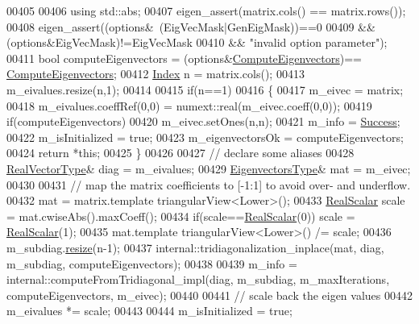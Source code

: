 \begin{DoxyCode}
00405   
00406   \textcolor{keyword}{using} std::abs;
00407   eigen\_assert(matrix.cols() == matrix.rows());
00408   eigen\_assert((options&~(EigVecMask|GenEigMask))==0
00409           && (options&EigVecMask)!=EigVecMask
00410           && \textcolor{stringliteral}{"invalid option parameter"});
00411   \textcolor{keywordtype}{bool} computeEigenvectors = (options&\hyperlink{group__enums_ggae3e239fb70022eb8747994cf5d68b4a9ada93d8885bde32b876ba4af01d3292cc}{ComputeEigenvectors})==
      \hyperlink{group__enums_ggae3e239fb70022eb8747994cf5d68b4a9ada93d8885bde32b876ba4af01d3292cc}{ComputeEigenvectors};
00412   \hyperlink{group___eigenvalues___module_a8a59ab7734b6eae2754fd78bc7c3a360}{Index} n = matrix.cols();
00413   m\_eivalues.resize(n,1);
00414 
00415   \textcolor{keywordflow}{if}(n==1)
00416   \{
00417     m\_eivec = matrix;
00418     m\_eivalues.coeffRef(0,0) = numext::real(m\_eivec.coeff(0,0));
00419     \textcolor{keywordflow}{if}(computeEigenvectors)
00420       m\_eivec.setOnes(n,n);
00421     m\_info = \hyperlink{group__enums_gga85fad7b87587764e5cf6b513a9e0ee5ea52581b035f4b59c203b8ff999ef5fcea}{Success};
00422     m\_isInitialized = \textcolor{keyword}{true};
00423     m\_eigenvectorsOk = computeEigenvectors;
00424     \textcolor{keywordflow}{return} *\textcolor{keyword}{this};
00425   \}
00426 
00427   \textcolor{comment}{// declare some aliases}
00428   \hyperlink{class_eigen_1_1internal_1_1_tensor_lazy_evaluator_writable}{RealVectorType}& diag = m\_eivalues;
00429   \hyperlink{group___core___module}{EigenvectorsType}& mat = m\_eivec;
00430 
00431   \textcolor{comment}{// map the matrix coefficients to [-1:1] to avoid over- and underflow.}
00432   mat = matrix.template triangularView<Lower>();
00433   \hyperlink{group___eigenvalues___module_a5dae5f422a3c71060e6bd31332bf64fd}{RealScalar} scale = mat.cwiseAbs().maxCoeff();
00434   \textcolor{keywordflow}{if}(scale==\hyperlink{group___eigenvalues___module_a5dae5f422a3c71060e6bd31332bf64fd}{RealScalar}(0)) scale = \hyperlink{group___eigenvalues___module_a5dae5f422a3c71060e6bd31332bf64fd}{RealScalar}(1);
00435   mat.template triangularView<Lower>() /= scale;
00436   m\_subdiag.\hyperlink{class_eigen_1_1_plain_object_base_a99d9054ee2d5a40c6e00ded0265e9cea}{resize}(n-1);
00437   internal::tridiagonalization\_inplace(mat, diag, m\_subdiag, computeEigenvectors);
00438 
00439   m\_info = internal::computeFromTridiagonal\_impl(diag, m\_subdiag, m\_maxIterations, computeEigenvectors, 
      m\_eivec);
00440   
00441   \textcolor{comment}{// scale back the eigen values}
00442   m\_eivalues *= scale;
00443 
00444   m\_isInitialized = \textcolor{keyword}{true};

\end{DoxyCode}

